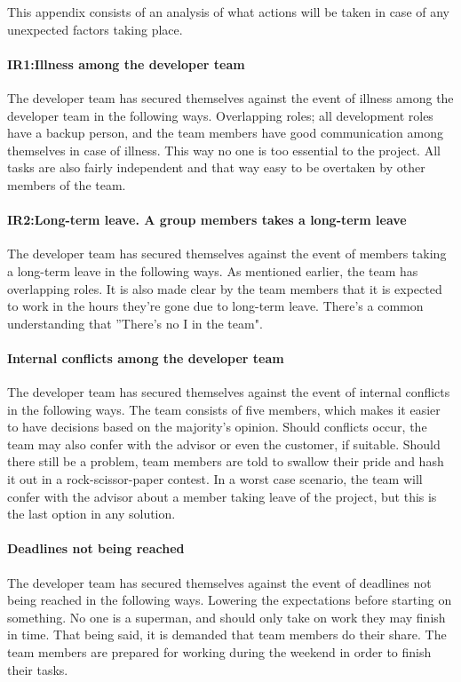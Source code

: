 
This appendix consists of an analysis of what actions will be taken in case of any unexpected factors taking place.\\

\paragraph{IR1:Illness among the developer team}
The developer team has secured themselves against the event of illness among the 
developer team in the following ways. Overlapping roles; all development roles have a 
backup person, and the team members have good communication among themselves in 
case of illness. This way no one is too essential to the project. All tasks are also 
fairly independent and that way easy to be overtaken by other members of the team.

\paragraph{IR2:Long-term leave. A group members takes a long-term leave}
The developer team has secured themselves against the event of members taking a 
long-term leave in the following ways. As mentioned earlier, the team has overlapping 
roles. It is also made clear by the team members that it is expected to work in the 
hours they're gone due to long-term leave. There's a common understanding that ''There's no I in the team".

\paragraph{Internal conflicts among the developer team}
The developer team has secured themselves against the event of internal conflicts 
in the following ways. The team consists of five members, which makes it easier 
to have decisions based on the majority's opinion. Should conflicts occur, the team 
may also confer with the advisor or even the customer, if suitable. Should there still 
be a problem, team members are told to swallow their pride and hash it out in a 
rock-scissor-paper contest. In a worst case scenario, the team will confer with the 
advisor about a member taking leave of the project, but this is the last option in any solution.

\paragraph{Deadlines not being reached}
The developer team has secured themselves against the event of deadlines not being 
reached in the following ways. Lowering the expectations before starting on something. 
No one is a superman, and should only take on work they may finish in time. That being 
said, it is demanded that team members do their share. The team members are prepared 
for working during the weekend in order to finish their tasks. 

